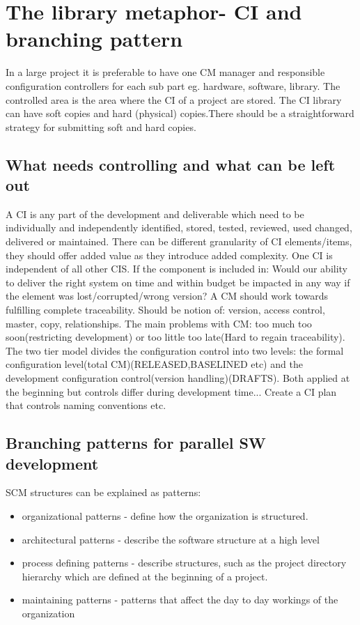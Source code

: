 \section{The library metaphor- CI and branching pattern}
In a large project it is preferable to have one CM manager and responsible configuration controllers for each sub part eg. hardware, software, library. The controlled area is the area
where the CI of a project are stored. The CI library can have soft copies and hard (physical) copies.There should be a straightforward strategy for submitting soft and hard copies.
\subsection{What needs controlling and what can be left out}
A CI is any part of the development and deliverable which need to be individually and independently identified, stored, tested, reviewed, used changed, delivered or maintained. There can be different 
granularity of CI elements/items, they should offer added value as they introduce added complexity. One CI is independent of all other CIS.
If the component is included in: Would our ability to deliver the right system on time and within budget be impacted in any way if the element was lost/corrupted/wrong version? 
A CM should work towards fulfilling complete traceability. Should be notion of: version, access control, master, copy, relationships.
The main problems with CM: too much too soon(restricting development) or too little too late(Hard to regain traceability). The two tier model divides the configuration control into two levels:
the formal configuration level(total CM)(RELEASED,BASELINED etc) and the development configuration control(version handling)(DRAFTS). Both applied at the beginning but controls differ during development time... 
Create a CI plan that controls naming conventions etc. 
\subsection{Branching patterns for parallel SW development}
SCM structures can be explained as patterns:
\begin{itemize}
    \item organizational patterns - define how the organization is structured.
    \item architectural patterns - describe the software structure at a high level
    \item process defining patterns - describe structures, such as the project directory hierarchy which are defined at the beginning of a project.
    \item maintaining patterns - patterns that affect the day to day workings of the organization
\end{itemize}
